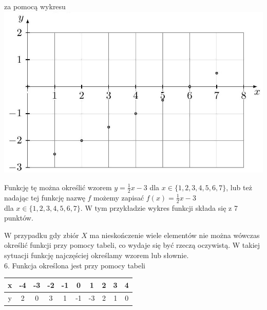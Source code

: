 \documentclass[10pt]{article}
\begin{document}
za pomocą wykresu\\
\includegraphics[max width=\textwidth, center]{2024_11_21_e9b4faa005d5be2cc318g-122}

Funkcję tę można określić wzorem \(y=\frac{1}{2} x-3\) dla \(x \in\{1,2,3,4,5,6,7\}\), lub też nadając tej funkcję nazwę \(f\) możemy zapisać \(f(x)=\frac{1}{2} x-3\)\\
dla \(x \in\{1,2,3,4,5,6,7\}\). W tym przykładzie wykres funkcji składa się z 7 punktów.

W przypadku gdy zbiór \(X\) ma nieskończenie wiele elementów nie można wówczas określić funkcji przy pomocy tabeli, co wydaje się być rzeczą oczywistą. W takiej sytuacji funkcję najczęściej określamy wzorem lub słownie.\\
6. Funkcja określona jest przy pomocy tabeli

\begin{center}
\begin{tabular}{|c|c|c|c|c|c|c|c|c|c|}
\hline
x & -4 & -3 & -2 & -1 & 0 & 1 & 2 & 3 & 4 \\
\hline
y & 2 & 0 & 3 & 1 & -1 & -3 & 2 & 1 & 0 \\
\hline
\end{tabular}
\end{center}
\end{document}
